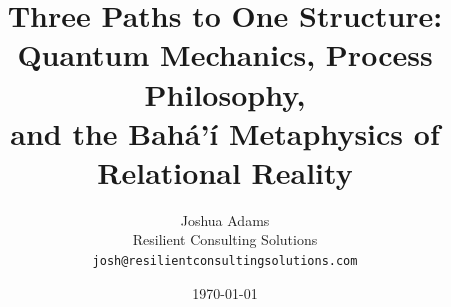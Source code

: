 \documentclass[12pt, a4paper]{article}
\begin{document}

\title{Three Paths to One Structure: Quantum Mechanics, Process Philosophy,\\
       and the Bahá'í Metaphysics of Relational Reality}

\author{Joshua Adams\\
        \small Resilient Consulting Solutions\\
        \small \texttt{josh@resilientconsultingsolutions.com}}

\date{\today}

\maketitle

\begin{abstract}

\end{abstract}

\newpage
\tableofcontents
\newpage











\end{document}
